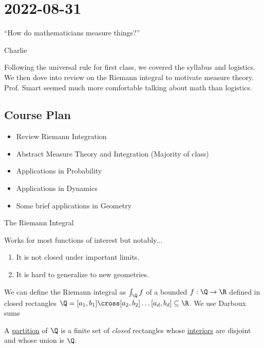 \section{2022-08-31}

\epigraph{``How do mathematicians measure things?''}{Charlie}

Following the universal rule for first class, we covered the syllabus and logistics. We then dove into review on the Riemann integral to motivate measure theory. Prof. Smart seemed much more comfortable talking about math than logistics.

\subsection{Course Plan}
\begin{itemize}
	\item Review Riemann Integration
	\item Abstract Measure Theory and Integration (Majority of class)
	\item Applications in Probability
	\item Applications in Dynamics
	\item Some brief applications in Geometry
\end{itemize}

\begin{problem} The Riemann Integral
\item Works for most functions of interest but notably...
	\begin{enumerate}
		\item It is not closed under important limits. 
		\item It is hard to generalize to new geometries.
	\end{enumerate}
\end{problem}

\begin{definition}
	We can define the Riemann integral as $\int_{{\Q}}^{{}} {f}$ of a bounded $f : \Q \to \R$
	defined in closed rectangles
	$\Q = [a_1,b_1] \cross [a_2,b_2] \ldots [a_d,b_d] \subseteq \R$. We use Darboux sums
\end{definition}

\vline
\begin{definition}[Partition]
	A \underline{partition} of $\Q$	is a finite set of \emph{closed} rectangles whose \underline{interiors} are disjoint and whose union is $\Q$.
\end{definition}

